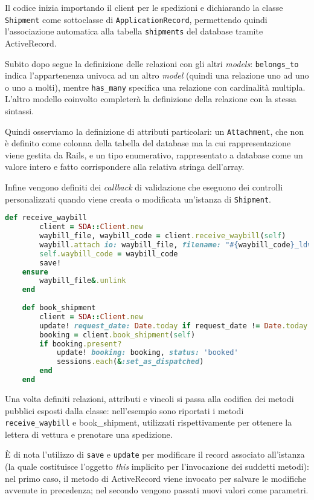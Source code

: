 Il codice inizia importando il client per le spedizioni e dichiarando la classe \texttt{Shipment} come sottoclasse di \texttt{ApplicationRecord}, permettendo quindi l'associazione automatica alla tabella \texttt{shipments} del database tramite ActiveRecord.

Subito dopo segue la definizione delle relazioni con gli altri \textit{models}: \texttt{belongs\_to} indica l'appartenenza univoca ad un altro \textit{model} (quindi una relazione uno ad uno o uno a molti), mentre \texttt{has\_many} specifica una relazione con cardinalità multipla. L'altro modello coinvolto completerà la definizione della relazione con la stessa sintassi.

Quindi osserviamo la definizione di attributi particolari: un \texttt{Attachment}, che non è definito come colonna della tabella del database ma la cui rappresentazione viene gestita da Rails, e un tipo enumerativo, rappresentato a database come un valore intero e fatto corrispondere alla relativa stringa dell'array.

Infine vengono definiti dei \textit{callback} di validazione che eseguono dei controlli personalizzati quando viene creata o modificata un'istanza di \texttt{Shipment}.
\begin{lstlisting}[caption={\textbf{\texttt{shipment.rb}}},captionpos=b,language=Ruby]
    def receive_waybill
        client = SDA::Client.new
        waybill_file, waybill_code = client.receive_waybill(self)
        waybill.attach io: waybill_file, filename: "#{waybill_code}_ldv.pdf"
        self.waybill_code = waybill_code
        save!
    ensure
        waybill_file&.unlink
    end
    
    def book_shipment
        client = SDA::Client.new
        update! request_date: Date.today if request_date != Date.today
        booking = client.book_shipment(self)
        if booking.present?
            update! booking: booking, status: 'booked'
            sessions.each(&:set_as_dispatched)
        end
    end
\end{lstlisting}
Una volta definiti relazioni, attributi e vincoli si passa alla codifica dei metodi pubblici esposti dalla classe: nell'esempio sono riportati i metodi \texttt{receive\_waybill} e {book\_shipment}, utilizzati rispettivamente per ottenere la lettera di vettura e prenotare una spedizione. 

È di nota l'utilizzo di \texttt{save} e \texttt{update} per modificare il record associato all'istanza (la quale costituisce l'oggetto \textit{this} implicito per l'invocazione dei suddetti metodi): nel primo caso, il metodo di ActiveRecord viene invocato per salvare le modifiche avvenute in precedenza; nel secondo vengono passati nuovi valori come parametri. 

